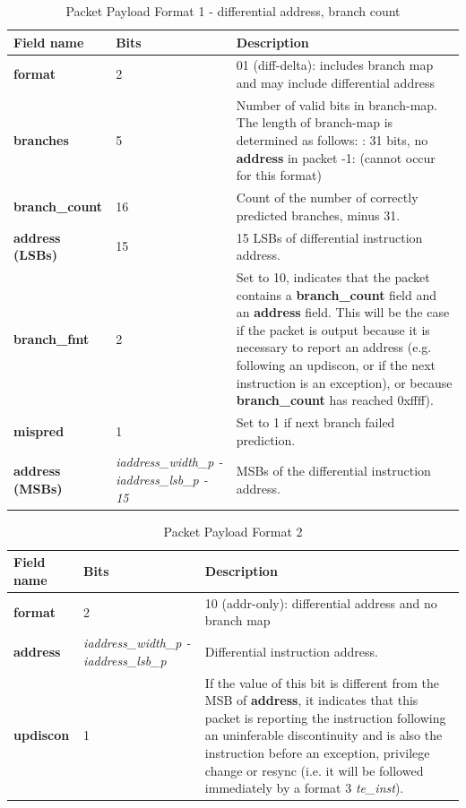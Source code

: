 \begin{table}[htp]
  \centering
  \caption{Packet Payload Format 1 - differential address, branch count}
  \label{tab:te_inst0-1-addr-count}
  \begin{tabulary}{\textwidth}{|l|p{35mm}|p{80mm}|}
    \hline
    {\bf Field name} & {\bf Bits} & {\bf Description} \\
    \hline
    \textbf{format}	& 2	& 01 (diff-delta): includes branch map and may include differential address\\
    \hline
    \textbf{branches} & 5 & Number of valid bits in branch-map. The length of branch-map is determined as follows: :      31 bits, no \textbf{address} in packet -1: 	(cannot occur for this format) \\
    \hline
    \textbf{branch\_count} & 16 & Count of the number of correctly predicted branches, minus 31. \\
    \hline
    \textbf{address (LSBs)}	& 15 & 
                15 LSBs of differential instruction address.\\
    \textbf{branch\_fmt} & 2 & Set to 10, indicates that the packet contains a \textbf{branch\_count} field and
     an \textbf{address} field. This will be the case if the packet is output because it is necessary to report an
     address (e.g. following an updiscon, or if the next instruction is an exception), or because \textbf{branch\_count} 
     has reached 0xffff).\\
    \hline
    \textbf{mispred} & 1 & Set to 1 if next branch failed prediction. \\
    \hline
    \textbf{address (MSBs)}	& \textit {iaddress\_width\_p - iaddress\_lsb\_p - 15} & 
                MSBs of the differential instruction address.\\
    \hline
  \end{tabulary}
\end{table}


\begin{table}[!h]
  \centering
  \caption{Packet Payload Format 2}
  \label{tab:te_inst2}
  \begin{tabulary}{\textwidth}{|l|p{35mm}|p{80mm}|}
    \hline
    {\bf Field name} & {\bf Bits} & {\bf Description} \\
    \hline
    \textbf{format}	& 2	& 10 (addr-only): differential address and no branch map\\
    \hline
    \textbf{address} & \textit {iaddress\_width\_p - iaddress\_lsb\_p} & 
              Differential instruction address.\\ 
    \hline
    \textbf{updiscon}	& 1 & 
                If the value of this bit is different from the MSB of \textbf{address}, it indicates that this 
                packet is reporting the instruction following an uninferable discontinuity and is also the 
                instruction before an exception, privilege change or resync 
                (i.e. it will be followed immediately by a format 3 \textit{te\_inst}).\\
    \hline
  \end{tabulary}
\end{table}

